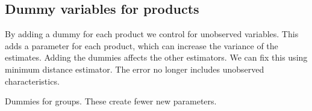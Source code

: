 
\subsection{Dummy variables for products}

By adding a dummy for each product we control for unobserved variables.
This adds a parameter for each product, which can increase the variance of the estimates.
Adding the dummies affects the other estimators. We can fix this using minimum distance estimator.
The error no longer includes unobserved characteristics.

Dummies for groups. These create fewer new parameters.

